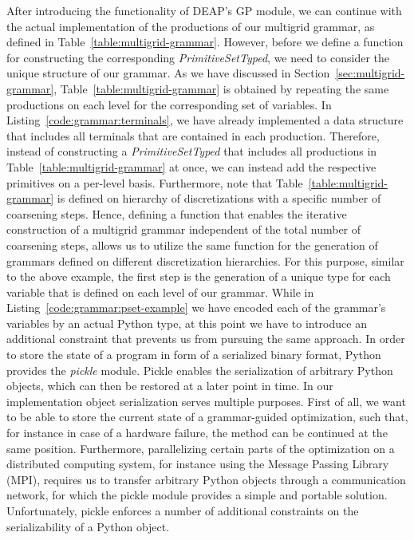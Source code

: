 After introducing the functionality of DEAP's GP module, we can continue with the actual implementation of the productions of our multigrid grammar, as defined in Table~\ref{table:multigrid-grammar}.
However, before we define a function for constructing the corresponding \emph{PrimitiveSetTyped}, we need to consider the unique structure of our grammar.
As we have discussed in Section~\ref{sec:multigrid-grammar}, Table~\ref{table:multigrid-grammar} is obtained by repeating the same productions on each level for the corresponding set of variables.
In Listing~\ref{code:grammar:terminals}, we have already implemented a data structure that includes all terminals that are contained in each production.
Therefore, instead of constructing a \emph{PrimitiveSetTyped} that includes all productions in Table~\ref{table:multigrid-grammar} at once, we can instead add the respective primitives on a per-level basis.
Furthermore, note that Table~\ref{table:multigrid-grammar} is defined on hierarchy of discretizations with a specific number of coarsening steps.
Hence, defining a function that enables the iterative construction of a multigrid grammar independent of the total number of coarsening steps, allows us to utilize the same function for the generation of grammars defined on different discretization hierarchies. 
For this purpose, similar to the above example, the first step is the generation of a unique type for each variable that is defined on each level of our grammar.
While in Listing~\ref{code:grammar:pset-example} we have encoded each of the grammar's variables by an actual Python type, at this point we have to introduce an additional constraint that prevents us from pursuing the same approach.
In order to store the state of a program in form of a serialized binary format, Python provides the \emph{pickle} module.
Pickle enables the serialization of arbitrary Python objects, which can then be restored at a later point in time.
In our implementation object serialization serves multiple purposes.
First of all, we want to be able to store the current state of a grammar-guided optimization, such that, for instance in case of a hardware failure, the method can be continued at the same position.
Furthermore, parallelizing certain parts of the optimization on a distributed computing system, for instance using the Message Passing Library (MPI), requires us to transfer arbitrary Python objects through a communication network, for which the pickle module provides a simple and portable solution.
Unfortunately, pickle enforces a number of additional constraints on the serializability of a Python object.
